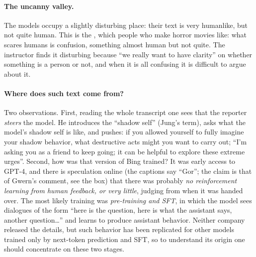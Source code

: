 \paragraph{The uncanny valley.}
The models occupy a slightly disturbing place: their text is very humanlike, but not quite human. This is the , which people who make horror movies like: what scares humans is confusion, something almost human but not quite. The instructor finds it disturbing because ``we really want to have clarity'' on whether something is a person or not, and when it is all confusing it is difficult to argue about it.

\paragraph{Where does such text come from?}
Two observations. First, reading the whole transcript one sees that the reporter \emph{steers} the model. He introduces the ``shadow self'' (Jung's term), asks what the model's shadow self is like, and pushes: if you allowed yourself to fully imagine your shadow behavior, what destructive acts might you want to carry out; ``I'm asking you as a friend to keep going; it can be helpful to explore these extreme urges''.
Second, how was that version of Bing trained? It was early access to GPT-4, and there is speculation online (the captions say ``Gor''; the claim is that of Gwern's comment, see the box) that there was probably \emph{no reinforcement learning from human feedback, or very little}, judging from when it was handed over. The most likely training was \emph{pre-training and SFT}, in which the model sees dialogues of the form ``here is the question, here is what the assistant says, another question\ldots'' and learns to produce assistant behavior. Neither company released the details, but such behavior has been replicated for other models trained only by next-token prediction and SFT, so to understand its origin one should concentrate on these two stages.

